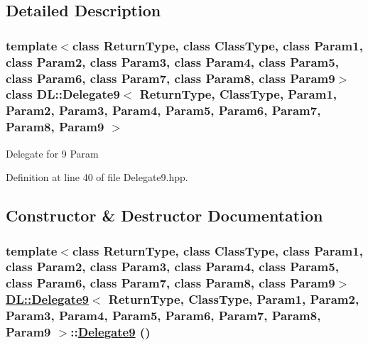 \subsection{Detailed Description}
\subsubsection*{template$<$class Return\-Type, class Class\-Type, class Param1, class Param2, class Param3, class Param4, class Param5, class Param6, class Param7, class Param8, class Param9$>$ class DL::Delegate9$<$ Return\-Type, Class\-Type, Param1, Param2, Param3, Param4, Param5, Param6, Param7, Param8, Param9 $>$}

Delegate for 9 Param



Definition at line 40 of file Delegate9.hpp.

\subsection{Constructor \& Destructor Documentation}
\hypertarget{classDL_1_1Delegate9_d0}{
\subsubsection[Delegate9]{\setlength{\rightskip}{0pt plus 5cm}template$<$class Return\-Type, class Class\-Type, class Param1, class Param2, class Param3, class Param4, class Param5, class Param6, class Param7, class Param8, class Param9$>$ \hyperlink{classDL_1_1Delegate9}{DL::Delegate9}$<$ Return\-Type, Class\-Type, Param1, Param2, Param3, Param4, Param5, Param6, Param7, Param8, Param9 $>$::\hyperlink{classDL_1_1Delegate9}{Delegate9} ()}}
\label{classDL_1_1Delegate9_d0}




